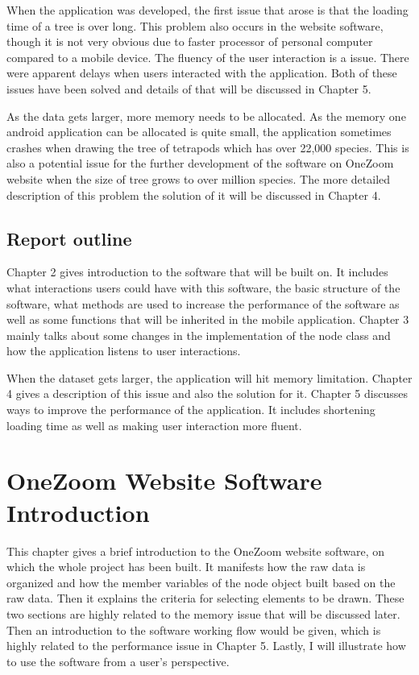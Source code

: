 \documentclass[MSc]{icldt}
\begin{document}
When the application was developed, the first issue that arose is that the loading time of a tree is over long. This problem also occurs in the website software, though it is not very obvious due to faster processor of personal computer compared to a mobile device. The fluency of the user interaction is a issue. There were apparent delays when users interacted with the application. Both of these issues have been solved and details of that will be discussed in Chapter 5.

As the data gets larger, more memory needs to be allocated. As the memory one android application can be allocated is quite small, the application sometimes crashes when drawing the tree of tetrapods which has over 22,000 species. This is also a potential issue for the further development of the software on OneZoom website when the size of tree grows to over million species. The more detailed description of this problem the solution of it will be discussed in Chapter 4.



\section{Report outline}

Chapter 2 gives introduction to the software that will be built on. It includes what interactions users could have with this software, the basic structure of the software, what methods are used to increase the performance of the software as well as some functions that will be inherited in the mobile application. Chapter 3 mainly talks about some changes in the implementation of the node class and how the application listens to user interactions. 

 When the dataset gets larger, the application will hit memory limitation. Chapter 4 gives a description of this issue and also the solution for it. Chapter 5 discusses ways to improve the performance of the application. It includes shortening loading time as well as making user interaction more fluent.
 

\chapter{OneZoom Website Software Introduction}

This chapter gives a brief introduction to the OneZoom website software, on which the whole project has been built. It manifests how the raw data is organized and how the member variables of the node object built based on the raw data. Then it explains the criteria for selecting elements to be drawn. These two sections are highly related to the memory issue that will be discussed later. Then an introduction to the software working flow would be given, which is highly related to the performance issue in Chapter 5. Lastly, I will illustrate how to use the software from a user's perspective.
\end{document}
